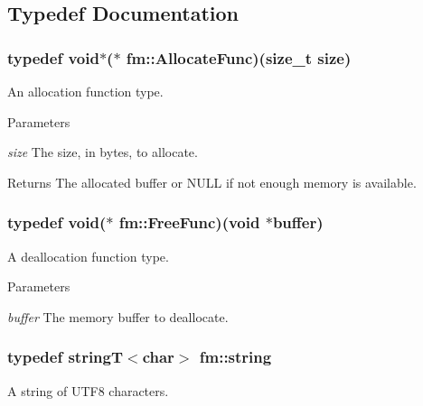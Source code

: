 \subsection{Typedef Documentation}
\hypertarget{namespacefm_a97324e93febfca76d5ed574a89c0197d}{
\subsubsection[{AllocateFunc}]{\setlength{\rightskip}{0pt plus 5cm}typedef void$\ast$($\ast$ {\bf fm::AllocateFunc})(size\_\-t size)}}
\label{namespacefm_a97324e93febfca76d5ed574a89c0197d}
An allocation function type. 
\begin{DoxyParams}{Parameters}
\item[{\em size}]The size, in bytes, to allocate. \end{DoxyParams}
\begin{DoxyReturn}{Returns}
The allocated buffer or NULL if not enough memory is available. 
\end{DoxyReturn}
\hypertarget{namespacefm_a9b240a6540d27367231e6fd6d93ec35c}{
\subsubsection[{FreeFunc}]{\setlength{\rightskip}{0pt plus 5cm}typedef void($\ast$ {\bf fm::FreeFunc})(void $\ast$buffer)}}
\label{namespacefm_a9b240a6540d27367231e6fd6d93ec35c}
A deallocation function type. 
\begin{DoxyParams}{Parameters}
\item[{\em buffer}]The memory buffer to deallocate. \end{DoxyParams}
\hypertarget{namespacefm_ac112eb8f56d62ea729aa6d1edd7233a4}{
\subsubsection[{string}]{\setlength{\rightskip}{0pt plus 5cm}typedef {\bf stringT}$<$char$>$ {\bf fm::string}}}
\label{namespacefm_ac112eb8f56d62ea729aa6d1edd7233a4}
A string of UTF8 characters. 

